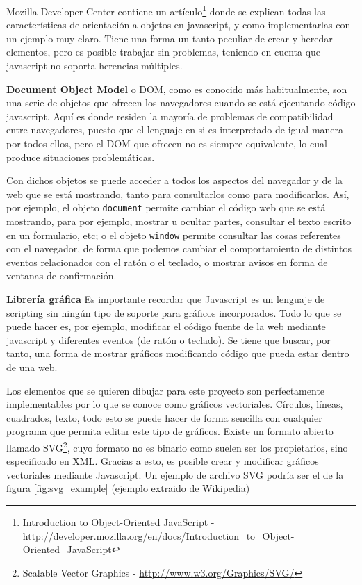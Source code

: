 Mozilla Developer Center contiene un artículo\footnote{Introduction to Object-Oriented JavaScript - \url{http://developer.mozilla.org/en/docs/Introduction_to_Object-Oriented_JavaScript}} donde se explican todas las características de orientación a objetos en javascript, y como implementarlas con un ejemplo muy claro. Tiene una forma un tanto peculiar de crear y heredar elementos, pero es posible trabajar sin problemas, teniendo en cuenta que javascript no soporta herencias múltiples.

\textbf{Document Object Model}
o DOM, como es conocido más habitualmente, son una serie de objetos que ofrecen los navegadores cuando se está ejecutando código javascript. Aquí es donde residen la mayoría de problemas de compatibilidad entre navegadores, puesto que el lenguaje en si es interpretado de igual manera por todos ellos, pero el DOM que ofrecen no es siempre equivalente, lo cual produce situaciones problemáticas.

Con dichos objetos se puede acceder a todos los aspectos del navegador y de la web que se está mostrando, tanto para consultarlos como para modificarlos. Así, por ejemplo, el objeto \texttt{document} permite cambiar el código web que se está mostrando, para por ejemplo, mostrar u ocultar partes, consultar el texto escrito en un formulario, etc; o el objeto \texttt{window} permite consultar las cosas referentes con el navegador, de forma que podemos cambiar el comportamiento de distintos eventos relacionados con el ratón o el teclado, o mostrar avisos en forma de ventanas de confirmación.

\textbf{Librería gráfica}
Es importante recordar que Javascript es un lenguaje de scripting sin ningún tipo de soporte para gráficos incorporados. Todo lo que se puede hacer es, por ejemplo, modificar el código fuente de la web mediante javascript y diferentes eventos (de ratón o teclado). Se tiene que buscar, por tanto, una forma de mostrar gráficos modificando código que pueda estar dentro de una web.

Los elementos que se quieren dibujar para este proyecto son perfectamente implementables por lo que se conoce como gráficos vectoriales. Círculos, líneas, cuadrados, texto, todo esto se puede hacer de forma sencilla con cualquier programa que permita editar este tipo de gráficos. Existe un formato abierto llamado SVG\footnote{Scalable Vector Graphics - \url{http://www.w3.org/Graphics/SVG/}}, cuyo formato no es binario como suelen ser los propietarios, sino especificado en XML. Gracias a esto, es posible crear y modificar gráficos vectoriales mediante Javascript. Un ejemplo de archivo SVG podría ser el de la figura \ref{fig:svg_example} (ejemplo extraido de Wikipedia)

